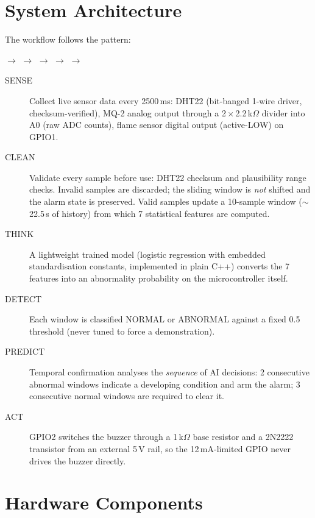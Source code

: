 \documentclass[11pt]{article}
\begin{document}
\section{System Architecture}
The workflow follows the pattern:

\begin{center}
 $\rightarrow$  $\rightarrow$ 
$\rightarrow$  $\rightarrow$ 
$\rightarrow$ 
\end{center}

\begin{description}
  \item[SENSE] Collect live sensor data every 2500\,ms: DHT22
    (bit-banged 1-wire driver, checksum-verified), MQ-2 analog output
    through a 2\,$\times$\,2.2\,k$\Omega$ divider into A0 (raw ADC
    counts), flame sensor digital output (active-LOW) on GPIO1.
  \item[CLEAN] Validate every sample before use: DHT22 checksum and
    plausibility range checks. Invalid samples are discarded; the
    sliding window is \emph{not} shifted and the alarm state is
    preserved. Valid samples update a 10-sample window
    ($\sim$22.5\,s of history) from which 7 statistical features are
    computed.
  \item[THINK] A lightweight trained model (logistic regression with
    embedded standardisation constants, implemented in plain C++)
    converts the 7 features into an abnormality probability on the
    microcontroller itself.
  \item[DETECT] Each window is classified NORMAL or ABNORMAL against
    a fixed 0.5 threshold (never tuned to force a demonstration).
  \item[PREDICT] Temporal confirmation analyses the \emph{sequence} of
    AI decisions: 2 consecutive abnormal windows indicate a developing
    condition and arm the alarm; 3 consecutive normal windows are
    required to clear it.
  \item[ACT] GPIO2 switches the buzzer through a 1\,k$\Omega$ base
    resistor and a 2N2222 transistor from an external 5\,V rail, so
    the 12\,mA-limited GPIO never drives the buzzer directly.
\end{description}

\section{Hardware Components}
\end{document}
